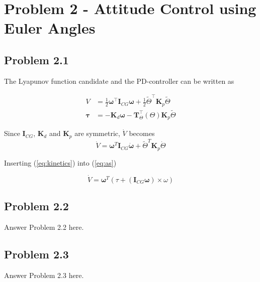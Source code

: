 \section*{Problem 2 - Attitude Control using Euler Angles}
\subsection*{Problem 2.1}
The Lyapunov function candidate and the PD-controller can be written as 

\begin{equation}
\begin{aligned}\label{eq:yes}
	V &= \frac{1}{2} \boldsymbol{\omega}^{\top} \mathbf{I}_{CG} \boldsymbol{\omega} + \frac{1}{2} \tilde{\Theta}^{\top} \mathbf{K}_p \tilde{\Theta} \\
	\boldsymbol{\tau} &= -\mathbf{K}_d \boldsymbol{\omega} -\mathbf{T}_{\Theta}^{\top}(\Theta) \mathbf{K}_p \tilde{\Theta}
\end{aligned}
\end{equation}


Since $\boldsymbol{I}_{CG}$, $\boldsymbol{K}_d$ and $\boldsymbol{K}_p$ are symmetric, $\dot{V}$ becomes
\begin{equation} \label{eq:as}
\dot{V} = \boldsymbol{\omega}^T\boldsymbol{I}_{CG}\dot{\boldsymbol{\omega}} + \tilde{\Theta}^T\boldsymbol{K}_p\dot{\Theta}
\end{equation}

Inserting  (\ref{eq:kinetics}) into (\ref{eq:as})

\begin{equation}
\dot{V} = \boldsymbol{\omega}^T\left( \tau + (\boldsymbol{I}_{CG}\boldsymbol{\omega})\times \omega \right)
\end{equation}

\subsection*{Problem 2.2}
Answer Problem 2.2 here.

\subsection*{Problem 2.3}
Answer Problem 2.3 here.

